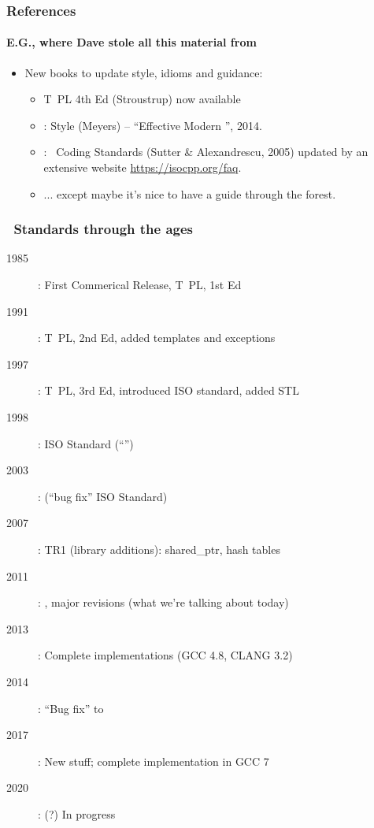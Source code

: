 \begin{frame}[fragile]
\frametitle{ References}
\framesubtitle{E.G., where Dave stole all this material from}
\begin{itemize}
  \item New books to update style, idioms and guidance:

    \pause{}
    \begin{itemize}
    \item {} T\CC~PL 4th Ed (Stroustrup) now available
      \pause{}

    \item {}: Style (Meyers) -- ``Effective Modern
      \CC'',  2014.
      \pause{}

    \item {}: \CC\ Coding Standards (Sutter \&
    Alexandrescu, 2005) updated by an extensive website \url{https://isocpp.org/faq}.

    \pause{}

    \item ... except maybe it's nice to have a guide through the  forest.
    \end{itemize}
\end{itemize}
\end{frame}
\lyxframeend{}




\begin{frame}[fragile,t]
\frametitle{\CC\ Standards through the ages}
\begin{description}
\item[1985]: First Commerical Release, T\CC~PL, 1st Ed
\item[1991]: T\CC~PL, 2nd Ed, added templates and exceptions
\item[1997]: T\CC~PL, 3rd Ed, introduced ISO standard, added STL
\item[1998]: ISO \CC Standard (``'')
\item[2003]:  (``bug fix'' ISO Standard)\par
\item[2007]: TR1 (library additions): shared\_ptr, hash tables
\item[2011]: , major revisions (what we're talking about today)
\item[2013]: Complete  implementations (GCC 4.8, CLANG 3.2)
\item[2014]:    ``Bug fix'' to 
\item[2017]:  New stuff; complete implementation in GCC 7
\item[2020]:  (?) In progress
\end{description}
\end{frame}


